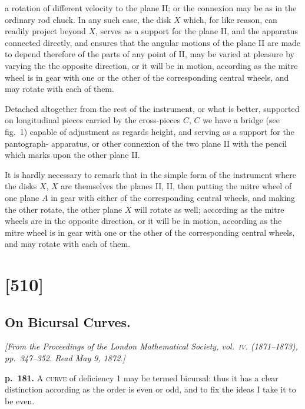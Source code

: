 \documentclass[11pt,a4paper]{article}
\begin{document}
a rotation of different velocity to the plane II; or the connexion may be as in the
ordinary rod chuck. In any such case, the disk $X$ which, for like reason, can readily
project beyond $X$, serves as a support for the plane II, and the apparatus connected directly, and ensures that the angular motions of the plane II are made to depend
therefore of the parts of any point of II, may be varied at pleasure by varying the
the opposite direction, or it will be in motion, according as the mitre wheel is in
gear with one or the other of the corresponding central wheels, and may rotate
with each of them.

Detached altogether from the rest of the instrument, or what is better, supported
on longitudinal pieces carried by the cross-pieces $C$, $C$ we have a bridge (see fig.\ 1)
capable of adjustment as regards height, and serving as a support for the pantograph-
apparatus, or other connexion of the two plane II with the pencil which marks upon
the other plane II.

It is hardly necessary to remark that in the simple form of the instrument where
the disks $X$, $X$ are themselves the planes II, II, then putting the mitre wheel of one
plane $A$ in gear with either of the corresponding central wheels, and making the other
rotate, the other plane $X$ will rotate as well; according as the mitre wheels are in
the opposite direction, or it will be in motion, according as the mitre wheel is in
gear with one or the other of the corresponding central wheels, and may rotate
with each of them.

\clearpage

\section{[510]}
\subsection{On Bicursal Curves.}

\begin{center}
\textit{[From the Proceedings of the London Mathematical Society, vol.\ \textsc{iv}. (1871--1873),
pp.\ 347--352.  Read May 9, 1872.]}
\end{center}

\noindent
\textbf{p.~181.}  \textsc{A curve} of deficiency 1 may be termed bicursal: thus it has a clear distinction
according as the order is even or odd, and to fix the ideas I take it to be even.
\end{document}
